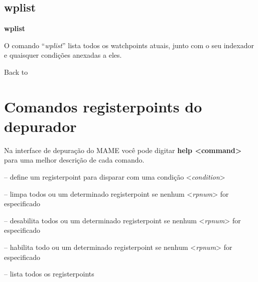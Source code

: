 \documentclass[letterpaper,10pt,brazil]{sphinxmanual}
\begin{document}
\subsection{wplist}
\label{debugger/watchpoint:debugger-command-wplist}\label{debugger/watchpoint:wplist}
\begin{DUlineblock}{0em}
\item[]
\begin{DUlineblock}{\DUlineblockindent}
\item[] \textbf{wplist}
\item[] 
\item[] O comando ``\emph{wplist}'' lista todos os watchpoints atuais, junto com o seu indexador e quaisquer condições anexadas a eles.
\item[] 
\end{DUlineblock}
\item[] Back to {\hyperref[debugger/watchpoint:debugger\string-watchpoints\string-list]{}}
\end{DUlineblock}


\section{Comandos registerpoints do depurador}
\label{debugger/registerpoints:comandos-registerpoints-do-depurador}\label{debugger/registerpoints::doc}\label{debugger/registerpoints:debugger-registerpoints-list}
Na interface de depuração do MAME você pode digitar \textbf{help \textless{}command\textgreater{}}
para uma melhor descrição de cada comando.

\begin{DUlineblock}{0em}
\item[] {\hyperref[debugger/registerpoints:debugger\string-command\string-rpset]{}} -- define um registerpoint para disparar com uma condição \textless{}\emph{condition}\textgreater{}
\item[] {\hyperref[debugger/registerpoints:debugger\string-command\string-rpclear]{}} -- limpa todos ou um determinado registerpoint se nenhum \textless{}\emph{rpnum}\textgreater{} for especificado
\item[] {\hyperref[debugger/registerpoints:debugger\string-command\string-rpdisable]{}} -- desabilita todos ou um determinado registerpoint se nenhum \textless{}\emph{rpnum}\textgreater{} for especificado
\item[] {\hyperref[debugger/registerpoints:debugger\string-command\string-rpenable]{}} -- habilita todo ou um determinado registerpoint se nenhum \textless{}\emph{rpnum}\textgreater{} for especificado
\item[] {\hyperref[debugger/registerpoints:debugger\string-command\string-rplist]{}} -- lista todos os registerpoints
\end{DUlineblock}
\begin{quote}
\label{debugger/registerpoints:debugger-command-rpset}\end{quote}
\end{document}
